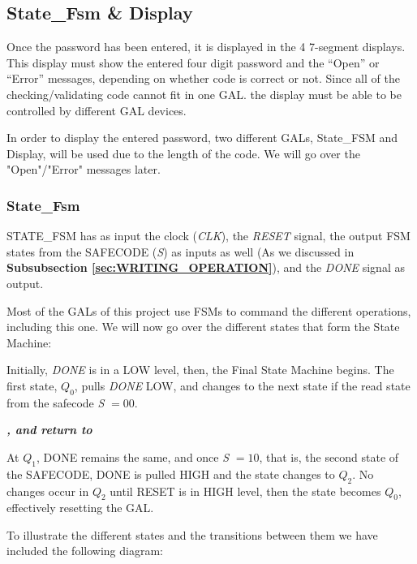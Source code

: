 \subsection{State\_Fsm \& Display}

Once the password has been entered, it is displayed in the 4 7-segment displays. This display must show the entered four digit password and the “Open” or “Error” messages, depending on whether code is correct or not. Since all of the checking/validating code cannot fit in one GAL. the display must be able to be controlled by different GAL devices.\medskip

In order to display the entered password, two different GALs, State\_FSM and Display, will be used due to the length of the code. We will go over the "Open"/"Error" messages later.\medskip


{\subsubsection{State\_Fsm} }
\medskip

STATE\_FSM has as input the clock (\textit{CLK}), the \textit{RESET} signal, the output FSM states from the SAFECODE (\textit{S}) as inputs as well (As we discussed in \textbf{Subsubsection \ref{sec:WRITING_OPERATION}}), and the \textit{DONE} signal as output. \medskip

Most of the GALs of this project use FSMs to command the different operations, including this one. We will now go over the different states that form the State Machine:

\medskip
\medskip

Initially, \textit{DONE}  is in a LOW level, then, the Final State Machine begins. The first state, \textit{$Q_0$}, pulls \textit{DONE} LOW, and changes to the next state if the read state from the safecode \textit{S} $= 00$. 

\medskip
{\textbf{\textit{,  and return to }}}
\medskip

At \textit{$Q_1$}, DONE remains the same, and once \textit{S} $= 10$, that is, the second state of the SAFECODE, DONE is pulled HIGH and the state changes to \textit{$Q_2$}. No changes occur in \textit{$Q_2$} until RESET is in HIGH level, then the state becomes \textit{$Q_0$}, effectively resetting the GAL.

\clearpage

To illustrate the different states and the transitions between them we have included the following diagram:\medskip

